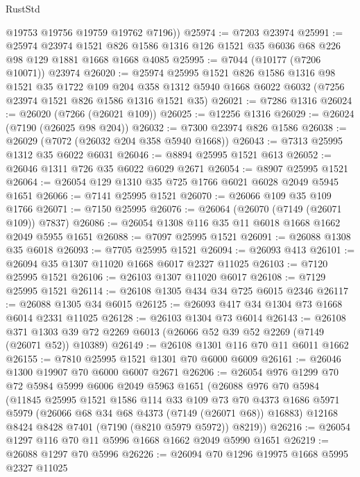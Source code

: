 \begin{lexlean}{RustStd}
\begin{coremodule}
        @19753
        @19756
        @19759
        @19762
        @7196))
@25974 := @7203 @23974
@25991 := @25974
    @23974
    @1521
    @826
    @1586
    @1316
    @126
    @1521
    @35
    @6036
    @68
    @226
    @98
    @129
    @1881
    @1668
    @1668
    @4085
@25995 := @7044 (@10177 (@7206 @10071)) @23974
@26020 := @25974
    @25995
    @1521
    @826
    @1586
    @1316
    @98
    @1521
    @35
    @1722
    @109
    @204
    @358
    @1312
    @5940
    @1668
    @6022
    @6032
    (@7256 @23974 @1521 @826 @1586 @1316 @1521 @35)
@26021 := @7286 @1316
@26024 := @26020 (@7266 (@26021 @109))
@26025 := @12256 @1316
@26029 := @26024 (@7190 (@26025 @98 @204))
@26032 := @7300 @23974 @826 @1586
@26038 := @26029 (@7072 (@26032 @204 @358 @5940 @1668))
@26043 := @7313 @25995 @1312 @35 @6022 @6031
@26046 := @8894 @25995 @1521 @613
@26052 := @26046 @1311 @726 @35 @6022 @6029 @2671
@26054 := @8907 @25995 @1521
@26064 := @26054 @129 @1310 @35 @725 @1766 @6021 @6028 @2049 @5945 @1651
@26066 := @7141 @25995 @1521
@26070 := @26066 @109 @35 @109 @1766
@26071 := @7150 @25995
@26076 := @26064 (@26070 (@7149 (@26071 @109)) @7837)
@26086 := @26054 @1308 @116 @35 @11 @6018 @1668 @1662 @2049 @5955 @1651
@26088 := @7097 @25995 @1521
@26091 := @26088 @1308 @35 @6018
@26093 := @7705 @25995 @1521
@26094 := @26093 @413
@26101 := @26094 @35 @1307 @11020 @1668 @6017 @2327 @11025
@26103 := @7120 @25995 @1521
@26106 := @26103 @1307 @11020 @6017
@26108 := @7129 @25995 @1521
@26114 := @26108 @1305 @434 @34 @725 @6015 @2346
@26117 := @26088 @1305 @34 @6015
@26125 := @26093 @417 @34 @1304 @73 @1668 @6014 @2331 @11025
@26128 := @26103 @1304 @73 @6014
@26143 := @26108
    @371
    @1303
    @39
    @72
    @2269
    @6013
    (@26066 @52 @39 @52 @2269 (@7149 (@26071 @52)) @10389)
@26149 := @26108 @1301 @116 @70 @11 @6011 @1662
@26155 := @7810 @25995 @1521 @1301 @70 @6000 @6009
@26161 := @26046 @1300 @19907 @70 @6000 @6007 @2671
@26206 := @26054
    @976
    @1299
    @70
    @72
    @5984
    @5999
    @6006
    @2049
    @5963
    @1651
    (@26088
      @976
      @70
      @5984
      (@11845
        @25995
        @1521
        @1586
        @114
        @33
        @109
        @73
        @70
        @4373
        @1686
        @5971
        @5979
        (@26066 @68 @34 @68 @4373 (@7149 (@26071 @68)) @16883)
        @12168
        @8424
        @8428
        @7401
        (@7190 (@8210 @5979 @5972))
        @8219))
@26216 := @26054 @1297 @116 @70 @11 @5996 @1668 @1662 @2049 @5990 @1651
@26219 := @26088 @1297 @70 @5996
@26226 := @26094 @70 @1296 @19975 @1668 @5995 @2327 @11025

\end{coremodule}
\end{lexlean}
